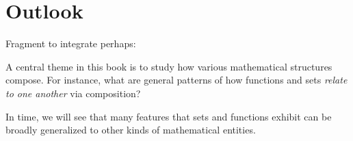 
\section{Outlook}\label{sec:functions-relations-outlook}




Fragment to integrate perhaps: 

A central theme in this book is to study how various mathematical structures compose.
For instance, what are general patterns of how functions and sets \emph{relate to one another} via composition?

In time, we will see that many features that sets and functions exhibit can be broadly generalized to other kinds of mathematical entities.
